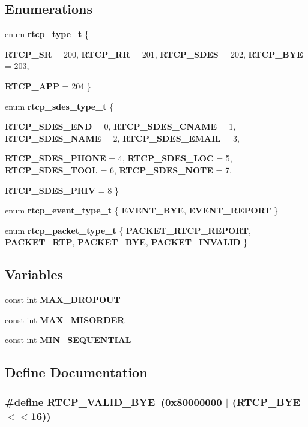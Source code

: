 \subsection*{Enumerations}
\begin{CompactItemize}
\item 
enum {\bf rtcp\_\-type\_\-t} \{ \par
{\bf RTCP\_\-SR} =  200, 
{\bf RTCP\_\-RR} =  201, 
{\bf RTCP\_\-SDES} =  202, 
{\bf RTCP\_\-BYE} =  203, 
\par
{\bf RTCP\_\-APP} =  204
 \}
\item 
enum {\bf rtcp\_\-sdes\_\-type\_\-t} \{ \par
{\bf RTCP\_\-SDES\_\-END} =  0, 
{\bf RTCP\_\-SDES\_\-CNAME} =  1, 
{\bf RTCP\_\-SDES\_\-NAME} =  2, 
{\bf RTCP\_\-SDES\_\-EMAIL} =  3, 
\par
{\bf RTCP\_\-SDES\_\-PHONE} =  4, 
{\bf RTCP\_\-SDES\_\-LOC} =  5, 
{\bf RTCP\_\-SDES\_\-TOOL} =  6, 
{\bf RTCP\_\-SDES\_\-NOTE} =  7, 
\par
{\bf RTCP\_\-SDES\_\-PRIV} =  8
 \}
\item 
enum {\bf rtcp\_\-event\_\-type\_\-t} \{ {\bf EVENT\_\-BYE}, 
{\bf EVENT\_\-REPORT}
 \}
\item 
enum {\bf rtcp\_\-packet\_\-type\_\-t} \{ {\bf PACKET\_\-RTCP\_\-REPORT}, 
{\bf PACKET\_\-RTP}, 
{\bf PACKET\_\-BYE}, 
{\bf PACKET\_\-INVALID}
 \}
\end{CompactItemize}
\subsection*{Variables}
\begin{CompactItemize}
\item 
const int {\bf MAX\_\-DROPOUT}
\item 
const int {\bf MAX\_\-MISORDER}
\item 
const int {\bf MIN\_\-SEQUENTIAL}
\end{CompactItemize}


\subsection{Define Documentation}
\subsubsection{\setlength{\rightskip}{0pt plus 5cm}\#define RTCP\_\-VALID\_\-BYE\ (0x80000000 $|$ (RTCP\_\-BYE$<$$<$16))}\label{rtp_8h_a7}


